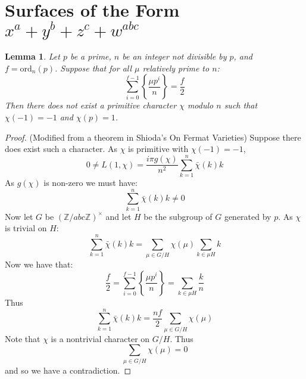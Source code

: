 \documentclass{article}
\newcommand{\Z}{\mathbb{Z}}
\newcommand{\ord}[0]{\mathrm{ord}}
\newcommand{\frp}[2]{\left\{\frac{#1}{#2}\right\}}
\newtheorem{lemma}[theorem]{Lemma}
\theoremstyle{definition}
\theoremstyle{definition}
\theoremstyle{remark}
\begin{document}
\section{Surfaces of the Form $x^{a}+y^{b}+z^{c}+w^{abc}$}

\begin{lemma}  \label{lem:prim_char_supersing_contradiction} Let $p$ be a prime, $n$ be an integer not divisible by $p$, and $f = \ord_n(p)$. Suppose that for all $\mu$ relatively prime to $n$:
\[\sum_{i=0}^{f-1} \frp{\mu p^i}{n} = \frac{f}{2}\]
Then there does not exist a primitive character $\chi$ modulo $n$ such that $\chi(-1) = -1$ and $\chi(p) = 1$.
\end{lemma}
\begin{proof} (Modified from a theorem in Shioda's On Fermat Varieties) Suppose there does exist such a character. As $\chi$ is primitive with $\chi(-1) = -1$,
\[0 \neq L(1, \chi) = \frac{i\pi g(\chi)}{n^2} \sum_{k = 1}^{n} \bar{\chi}(k)k\]
As $g(\chi)$ is non-zero we must have: 
\[\sum_{k = 1}^{n}\bar{\chi}(k)k \neq 0\]
Now let $G$ be $(\Z/abc\Z)^{\times}$ and let $H$ be the subgroup of $G$ generated by $p$. As $\chi$ is trivial on $H$:
\[\sum_{k = 1}^{n}\bar{\chi}(k)k = \sum_{\mu \in G/H} \chi(\mu) \sum_{k \in \mu H} k\]
Now we have that:
\[ \frac{f}{2} = \sum_{i=0}^{f-1} \frp{\mu p^i}{n} = \sum_{k \in \mu H} \frac{k}{n}\]
Thus 
\[\sum_{k = 1}^{n}\bar{\chi}(k)k = \frac{nf}{2} \sum_{\mu \in G/H} \chi(\mu)\]
Note that $\chi$ is a nontrivial character on $G/H$. Thus
\[\sum_{\mu \in G/H} \chi(\mu) = 0\]
and so we have a contradiction.
\end{proof}
\end{document}
